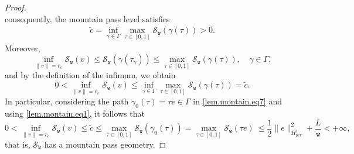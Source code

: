 \documentclass[10pt,a4paper]{amsart}
\begin{document}
\begin{proof}
\begin{equation}
 	\end{equation}consequently, the mountain pass level satisfies
 	\begin{align}\label{level}
 		\tilde{c}=\inf_{\gamma\in\Gamma}\max_{\tau\in[0,1]} \mathcal{S}_\mathtt{w}(\gamma(\tau))>0.
 	\end{align}
 	Moreover,
 	\begin{equation}\label{lem.montain.eq6} \inf_{\|v\|=r_e}\mathcal{S}_\mathtt{w}(v)\leq\mathcal{S}_\mathtt{w}(\gamma(\tau_\gamma))\leq \max_{\tau\in[0,1]} \mathcal{S}_\mathtt{w}(\gamma(\tau)), \quad\gamma\in \Gamma,\nonumber
 	\end{equation}and by the definition of the infimum, we obtain
 	\begin{equation}\label{lem.montain.eq7} 0<\inf_{\|v\|=r_e}\mathcal{S}_\mathtt{w}(v) \leq \inf_{\gamma\in\Gamma}\max_{\tau\in[0,1]} \mathcal{S}_\mathtt{w}(\gamma(\tau)) =\tilde{c}.
 	\end{equation}In particular, considering the path $\gamma_0(\tau)=\tau e \in \Gamma$ 		  
 	in \eqref{lem.montain.eq7} and using \eqref{lem.montain.eq1}, it follows that
 	\begin{equation}\label{lem.montain.eq8} 0<\inf_{\|v\|=r_e}\mathcal{S}_\mathtt{w}(v) \leq\tilde{c}\leq     \max_{\tau\in[0,1]}\mathcal{S}_\mathtt{w}(\gamma_0(\tau)) =\max_{\tau\in[0,1]}\mathcal{S}_\mathtt{w}(\tau e)\ \leq \frac{1}{2}\|e\|^2_{H^1_{per}}+\frac{L}{\mathtt{w}}<+\infty,
 	\end{equation}
 	 that is, $\mathcal{S}_\mathtt{w}$ has a mountain pass geometry. \end{proof}
\end{document}
